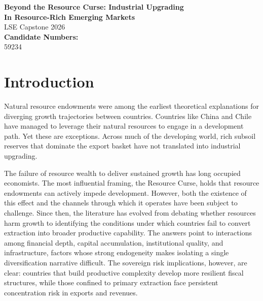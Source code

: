 \documentclass[12pt,a4paper]{report}
\begin{document}
\begin{titlepage}
\begin{center}
\vspace*{3cm}
{\LARGE \textbf{Beyond the Resource Curse: Industrial Upgrading\\[6pt]
In Resource-Rich Emerging Markets}}\\[2cm]
{\large LSE Capstone 2026}\\[2cm]
{\large \textbf{Candidate Numbers:}}\\[0.5cm]
{\large 59234    }\\[4cm]
\vfill
\end{center}
\end{titlepage}

\tableofcontents
\clearpage
\listoffigures
\clearpage
\listoftables
\clearpage


\chapter{Introduction}

Natural resource endowments were among the earliest theoretical explanations for diverging growth trajectories between countries. Countries like China and Chile have managed to leverage their natural resources to engage in a development path. Yet these are exceptions. Across much of the developing world, rich subsoil reserves that dominate the export basket have not translated into industrial upgrading.

The failure of resource wealth to deliver sustained growth has long occupied economists. The most influential framing, the Resource Curse, holds that resource endowments can actively impede development. However, both the existence of this effect and the channels through which it operates have been subject to challenge. Since then, the literature has evolved from debating whether resources harm growth to identifying the conditions under which countries fail to convert extraction into broader productive capability. The answers point to interactions among financial depth, capital accumulation, institutional quality, and infrastructure, factors whose strong endogeneity makes isolating a single diversification narrative difficult. The sovereign risk implications, however, are clear: countries that build productive complexity develop more resilient fiscal structures, while those confined to primary extraction face persistent concentration risk in exports and revenues.
\end{document}
